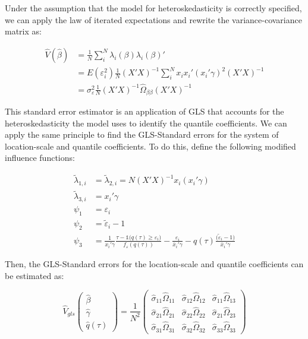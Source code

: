 \documentclass[
  authoryear,
  review,
  1p]{elsarticle}
\begin{document}
Under the assumption that the model for heteroskedasticity is correctly
specified, we can apply the law of iterated expectations and rewrite the
variance-covariance matrix as:

\[\begin{aligned}
\hat V(\hat \beta) &= \frac{1}{N} \sum_i^N \lambda_{i}(\beta) \lambda_{i}(\beta)' \\
&= E(\varepsilon_i^2) \frac{1}{N}  (X'X)^{-1}  \sum_i^N x_i x_i' ( x_i'\gamma)^2 (X'X)^{-1} \\
&= \sigma^2_{\varepsilon} \frac{1}{N}  (X'X)^{-1}  \hat\Omega_{\beta\beta} (X'X)^{-1}  
\end{aligned}
\]

This standard error estimator is an application of GLS that accounts for
the heteroskedasticity the model uses to identify the quantile
coefficients. We can apply the same principle to find the GLS-Standard
errors for the system of location-scale and quantile coefficients. To do
this, define the following modified influence functions:

\[\begin{aligned}
\tilde \lambda_{1,i}&=\tilde \lambda_{2,i}=N (X'X)^{-1}  x_i ( x_i'\gamma) \\  
\tilde \lambda_{3,i}&=x_i' \gamma  \\
 \psi_1 &= \varepsilon_i \\
 \psi_2 &= \tilde \varepsilon_i -1 \\
 \psi_3 &= \frac{1}{ x_i' \gamma }\frac{\tau-\mathbb{1}\big( q(\tau)  \geq \varepsilon_i  \big) }{ f_{\varepsilon}(q(\tau))} - \frac{\varepsilon_i }{\bar x_i'\gamma} 
-  q(\tau) \frac{(\tilde \varepsilon_i -1\big)}{\bar x_i'\gamma}
\end{aligned}
\]

Then, the GLS-Standard errors for the location-scale and quantile
coefficients can be estimated as:

\[\hat{V}_{gls}
  \begin{pmatrix}
  \hat\beta \\
  \hat\gamma \\
  \hat q(\tau)
  \end{pmatrix}
 = \frac{1}{N^2} 
 \begin{pmatrix}
 \hat\sigma_{11} \hat\Omega_{11} & \hat\sigma_{12} \hat\Omega_{12} & \hat\sigma_{11} \hat\Omega_{13} \\
 \hat\sigma_{21} \hat\Omega_{21} & \hat\sigma_{22} \hat\Omega_{22} & \hat\sigma_{21} \hat\Omega_{23} \\
 \hat\sigma_{31} \hat\Omega_{31} & \hat\sigma_{32} \hat\Omega_{32} & \hat\sigma_{33} \hat\Omega_{33}
  \end{pmatrix}
\]
\end{document}
